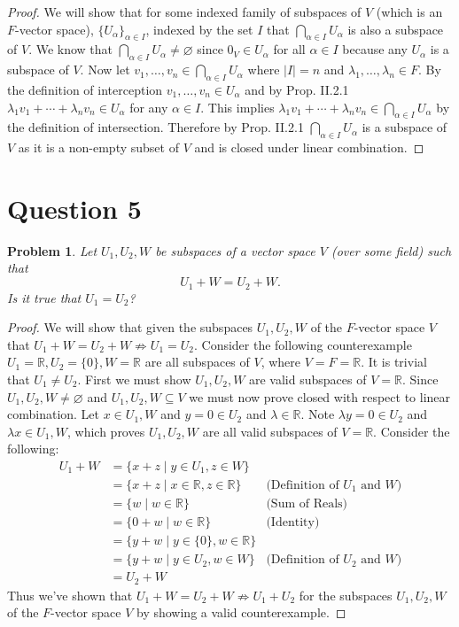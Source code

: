 \documentclass[12pt, letterpaper]{article}
\newcommand{\R}{\mathbb{R}}
\theoremstyle{plain}
\newtheorem{prob}[theorem]{Problem}
\theoremstyle{definition}
\theoremstyle{remark}
\begin{document}
\begin{proof}
    We will show that for some indexed family of subspaces of $V$ (which is an $F$-vector space), $\{U_\alpha\}_{\alpha\in I}$, indexed by the set $I$ that $\bigcap_{\alpha\in I}U_\alpha$ is also a subspace of $V$. We know that $\bigcap_{\alpha\in I}U_\alpha\ne\varnothing$ since $0_V\in U_\alpha$ for all $\alpha\in I$ because any $U_\alpha$ is a subspace of $V$. Now let $v_1,\ldots,v_n\in\bigcap_{\alpha\in I}U_\alpha$ where $|I|=n$ and $\lambda_1,\ldots,\lambda_n\in F$. By the definition of interception $v_1,\ldots,v_n\in U_\alpha$ and by Prop. II.2.1 $\lambda_1v_1+\cdots+\lambda_nv_n\in U_\alpha$ for any $\alpha\in I$. This implies $\lambda_1v_1+\cdots+\lambda_nv_n\in \bigcap_{\alpha\in I}U_\alpha$ by the definition of intersection. Therefore by Prop. II.2.1 $\bigcap_{\alpha\in I}U_\alpha$ is a subspace of $V$ as it is a non-empty subset of $V$ and is closed under linear combination.
\end{proof}

\section{Question 5}

\begin{prob}
Let $U_1,U_2,W$ be subspaces of a vector space $V$ (over some field) such that $$U_1+W=U_2+W.$$ Is it true that $U_1=U_2$?
\end{prob}

\begin{proof}
    We will show that given the subspaces $U_1,U_2,W$ of the $F$-vector space $V$ that $U_1+W=U_2+W\not\Rightarrow U_1=U_2$. Consider the following counterexample $U_1=\R,U_2=\{0\},W=\R$ are all subspaces of $V$, where $V=F=\R$. It is trivial that $U_1\ne U_2$. First we must show $U_1,U_2,W$ are valid subspaces of $V=\R$. Since $U_1,U_2,W\ne\varnothing$ and $U_1,U_2,W\subseteq V$ we must now prove closed with respect to linear combination. Let $x\in U_1,W$ and $y=0\in U_2$ and $\lambda\in \R$. Note $\lambda y=0\in U_2$ and $\lambda x\in U_1,W$, which proves $U_1,U_2,W$ are all valid subspaces of $V=\R$. Consider the following:
    \begin{align*}
        U_1+W &= \{x+z\mid y\in U_1,z\in W\} \\
              &= \{x+z\mid x\in \R,z\in \R\} &\text{(Definition of $U_1$ and $W$)}\\
              &= \{w\mid w\in \R\} &\text{(Sum of Reals)}\\
              &= \{0+w\mid w\in \R\} &\text{(Identity)}\\
              &= \{y+w\mid y\in\{0\},w\in\R\}\\
              &= \{y+w\mid y\in U_2,w\in W\} &\text{(Definition of $U_2$ and $W$)}\\
              &= U_2+W
    \end{align*}
    Thus we've shown that $U_1+W=U_2+W\not\Rightarrow U_1+U_2$ for the subspaces $U_1,U_2,W$ of the $F$-vector space $V$ by showing a valid counterexample.
\end{proof}
\end{document}
